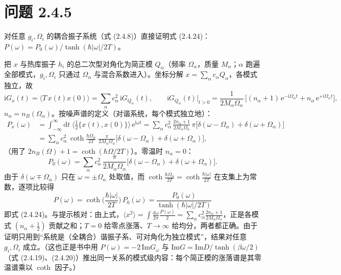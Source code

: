 \section*{问题 2.4.5}
\begin{problem}
对任意 $g_i,\Omega_i$ 的耦合振子系统（式 (2.4.8)）直接证明式 (2.4.24)：$P(\omega)=P_0(\omega)/\tanh(\hbar|\omega|/2T)$。
\end{problem}
\solution
把 $x$ 与热库振子 $h_i$ 的总二次型对角化为简正模 $Q_\alpha$（频率 $\Omega_\alpha$，质量 $M_\alpha$；$\alpha$ 跑遍全部模式，$g_i,\Omega_i$ 只通过 $\Omega_\alpha$ 与混合系数进入）。坐标分解 $x=\sum_\alpha c_\alpha Q_\alpha$，各模式独立，故
\begin{equation*}
\mathrm{i}G_x(t)=\langle T\,x(t)x(0)\rangle=\sum_\alpha c_\alpha^2\,\mathrm{i}G_{Q_\alpha}(t),
\qquad
\mathrm{i}G_{Q_\alpha}(t)\big|_{t>0}=\frac{1}{2M_\alpha\Omega_\alpha}\,
\big[(n_\alpha+1)\,\mathrm{e}^{-\mathrm{i}\Omega_\alpha t}+n_\alpha\,\mathrm{e}^{+\mathrm{i}\Omega_\alpha t}\big],
\end{equation*}
$n_\alpha=n_B(\Omega_\alpha)$。按噪声谱的定义（对谐系统，每个模式独立地）：
\begin{align*}
P_x(\omega)&=\int_{-\infty}^{\infty}\mathrm{d}t\;
\big\langle\tfrac12\{x(t),x(0)\}\big\rangle\,\mathrm{e}^{\mathrm{i}\omega t}
=\sum_\alpha c_\alpha^2\,\frac{2n_\alpha+1}{2M_\alpha\Omega_\alpha}\,\pi\big[\delta(\omega-\Omega_\alpha)+\delta(\omega+\Omega_\alpha)\big]\\
&=\sum_\alpha c_\alpha^2\,\coth\frac{\hbar\Omega_\alpha}{2T}\;
\frac{\pi}{2M_\alpha\Omega_\alpha}\big[\delta(\omega-\Omega_\alpha)+\delta(\omega+\Omega_\alpha)\big],
\end{align*}
（用了 $2n_B(\Omega)+1=\coth(\hbar\Omega/2T)$）。零温时 $n_\alpha=0$：
\begin{equation*}
P_0(\omega)=\sum_\alpha c_\alpha^2\,\frac{\pi}{2M_\alpha\Omega_\alpha}
\big[\delta(\omega-\Omega_\alpha)+\delta(\omega+\Omega_\alpha)\big].
\end{equation*}
由于 $\delta(\omega\mp\Omega_\alpha)$ 只在 $\omega=\pm\Omega_\alpha$ 处取值，而 $\coth\frac{\hbar\Omega_\alpha}{2T}=\coth\frac{\hbar|\omega|}{2T}$ 在支集上为常数，逐项比较得
\begin{equation*}
\boxed{\;P(\omega)=\coth\!\Big(\frac{\hbar|\omega|}{2T}\Big)\,P_0(\omega)
=\frac{P_0(\omega)}{\tanh(\hbar|\omega|/2T)}\;}
\end{equation*}
即式 (2.4.24)。与提示核对：由上式，$\langle x^2\rangle=\int\frac{\mathrm{d}\omega}{2\pi}\frac{P(\omega)}2
=\sum_\alpha c_\alpha^2\frac{2n_\alpha+1}{2M_\alpha\Omega_\alpha}$，正是各模式 $(n_\alpha+\frac12)$ 贡献之和；$T=0$ 给零点涨落、$T\to\infty$ 给均分，两者都正确。由于证明只用到“系统是（全耦合）谐振子系、可对角化为独立模式”，结果对任意 $g_i,\Omega_i$ 成立。（这也正是书中用 $P(\omega)=-2\,\mathrm{Im}G_\omega$ 与 $\mathrm{Im}G=\mathrm{Im}D/\tanh(\beta\omega/2)$（式 (2.4.19)、(2.4.20)）推出同一关系的模式级内容：每个简正模的涨落谱是其零温谱乘以 $\coth$ 因子。）

